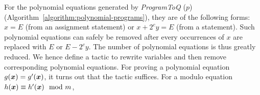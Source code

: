 For the polynomial equations generated by \textit{ProgramToQ}
($p$) (Algorithm~\ref{algorithm:polynomial-programs}), they are of the
following forms: $x = E$ (from an assignment statement) or $x + 2^c y
= E$ (from a  statement). Such polynomial equations can
safely be removed after every occurrences of $x$ are replaced with $E$
or $E - 2^c y$. The number of polynomial equations is thus greatly
reduced. We hence define a \coq tactic to rewrite variables and then
remove corresponding polynomial equations. For proving a polynomial
equation $g (\vx) = g' (\vx)$, it turns out that the \coq tactic
 suffices. For a modulo equation $h (\vx) \equiv
h' (\vx) \mod m$, 

